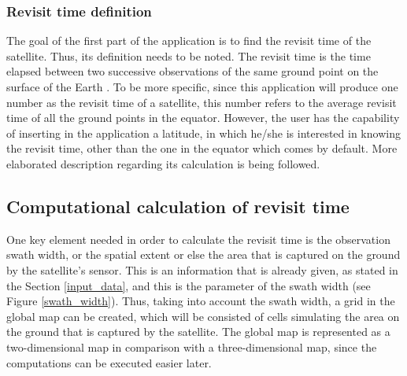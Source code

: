 \bigskip
\subsubsection{Revisit time definition}
\bigskip

The goal of the first part of the application is to find the revisit time of the satellite. Thus, its definition needs to be noted. The revisit time is the time elapsed between two successive observations of the same ground point on the surface of the Earth \cite{Luo}. To be more specific, since this application will produce one number as the revisit time of a satellite, this number refers to the average revisit time of all the ground points in the equator. However, the user has the capability of inserting in the application a latitude, in which he/she is interested in knowing the revisit time, other than the one in the equator which comes by default. More elaborated description regarding its calculation is being followed.


\bigskip
\subsection{Computational calculation of revisit time}
\bigskip

One key element needed in order to calculate the revisit time is the observation swath width, or the spatial extent or else the area that is captured on the ground by the satellite's sensor. This is an information that is already given, as stated in the Section \ref{input_data}, and this is the parameter of the swath width (see Figure \ref{swath_width}). Thus, taking into account the swath width, a grid in the global map can be created, which will be consisted of cells simulating the area on the ground that is captured by the satellite. The global map is represented as a two-dimensional map in comparison with a three-dimensional map, since the computations can be executed easier later.

